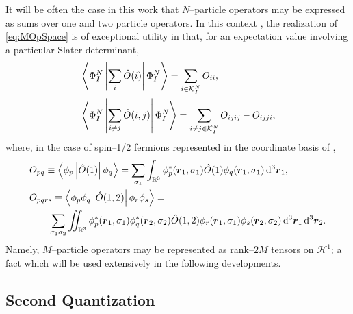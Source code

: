 It will be often the case in this work that $N$--particle operators may be expressed as sums over one and
two particle operators. In this context , the realization of \cref{eq:MOpSpace} is of exceptional utility in that,
for an expectation value involving a particular Slater determinant,
\begin{subequations}
  \label{eq:SlaterCondon}
\begin{align}
  &\left\langle \Phi^N_I \left\vert \sum_i\hat{O}(i) \right\vert \Phi^N_I \right\rangle = \sum_{i\in\mathcal{K}^N_I} O_{ii},\\
  &\left\langle \Phi^N_I \left\vert \sum_{i\neq j} \hat{O}(i,j) \right\vert \Phi^N_I \right\rangle = 
    \sum_{i\neq j \in\mathcal{K}^N_I} O_{ijij} - O_{ijji},
\end{align}
\end{subequations}
where, in the case of spin--1/2 fermions represented in the coordinate basis of ,
\begin{subequations}
  \label{eq:DiracInts}
\begin{align}
  &O_{pq} \equiv \left\langle \phi_p \left\vert \hat{O}(1) \right\vert \phi_q \right\rangle = 
    \sum_{\sigma_1} \int_{\mathbb{R}^3} \phi_p^*(\boldsymbol{r}_1,\sigma_1) \hat{O}(1) \phi_q(\boldsymbol{r}_1,\sigma_1) \,\mathrm{d}^3 \boldsymbol{r}_1,\\
  &O_{pqrs} \equiv \left\langle \phi_p \phi_q  \left\vert \hat{O}(1,2) \right\vert \phi_r \phi_s \right\rangle = \nonumber \\ &\qquad
    \sum_{\sigma_1 \sigma_2} \int\mkern-12mu\int_{\mathbb{R}^3} 
      \phi_p^*(\boldsymbol{r}_1,\sigma_1) \phi_q^*(\boldsymbol{r}_2,\sigma_2) \hat{O}(1,2) 
      \phi_r(\boldsymbol{r}_1,\sigma_1) \phi_s(\boldsymbol{r}_2,\sigma_2) \,\mathrm{d}^3 \boldsymbol{r}_1 \,\mathrm{d}^3 \boldsymbol{r}_2.
\end{align}
\end{subequations}
Namely, $M$--particle operators may be represented as rank--$2M$ tensors on $\mathcal{H}^1$; a fact which will
be used extensively in the following developments.


\subsection{Second Quantization}
\label{sec:SQ}


